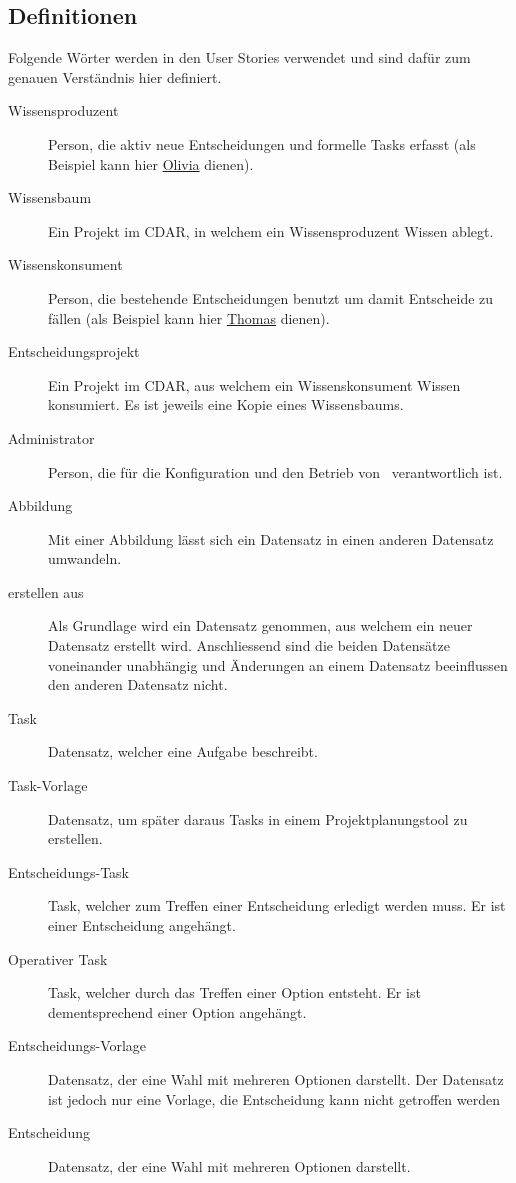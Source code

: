 	\subsection{Definitionen}\label{userstoryDefinitions}
		Folgende Wörter werden in den User Stories verwendet und sind dafür zum genauen Verständnis hier definiert.
		\begin{description}
			\item[Wissensproduzent] Person, die aktiv neue Entscheidungen und formelle Tasks erfasst (als Beispiel kann hier \hyperref[olivia]{Olivia} dienen).
			\item[Wissensbaum] Ein Projekt im CDAR, in welchem ein Wissensproduzent Wissen ablegt.
			\item[Wissenskonsument] Person, die bestehende Entscheidungen benutzt um damit Entscheide zu fällen (als Beispiel kann hier \hyperref[thomas]{Thomas} dienen).
			\item[Entscheidungsprojekt] Ein Projekt im CDAR, aus welchem ein Wissenskonsument Wissen konsumiert.
				Es ist jeweils eine Kopie eines Wissensbaums.
			\item[Administrator] Person, die für die Konfiguration und den Betrieb von \eeppi\ verantwortlich ist.
			\item[Abbildung] Mit einer Abbildung lässt sich ein Datensatz in einen anderen Datensatz umwandeln.
			\item[erstellen aus] Als Grundlage wird ein Datensatz genommen, aus welchem ein neuer Datensatz erstellt wird.
				Anschliessend sind die beiden Datensätze voneinander unabhängig und Änderungen an einem Datensatz beeinflussen den anderen Datensatz nicht.
			\item[Task] Datensatz, welcher eine Aufgabe beschreibt.
			\item[Task-Vorlage] Datensatz, um später daraus Tasks in einem Projektplanungstool zu erstellen.
			\item[Entscheidungs-Task] Task, welcher zum Treffen einer Entscheidung erledigt werden muss.
				Er ist einer Entscheidung angehängt.
			\item[Operativer Task] Task, welcher durch das Treffen einer Option entsteht.
				Er ist dementsprechend einer Option angehängt.
			\item[Entscheidungs-Vorlage] Datensatz, der eine Wahl mit mehreren Optionen darstellt.
				Der Datensatz ist jedoch nur eine Vorlage, die Entscheidung kann nicht getroffen werden
			\item[Entscheidung] Datensatz, der eine Wahl mit mehreren Optionen darstellt.

\end{description}

